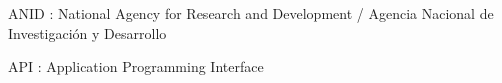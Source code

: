 \documentclass[english, 12pt]{report}
\begin{document}





















 ANID : National Agency for Research and Development / Agencia Nacional de Investigación y Desarrollo
 
 API : Application Programming Interface
 
 


\cleardoublepage


\end{document}

